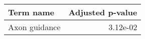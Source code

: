 \begin{tabular}{lr}
\toprule
    Term name &  Adjusted p-value \\
\midrule
Axon guidance &          3.12e-02 \\
\bottomrule
\end{tabular}
